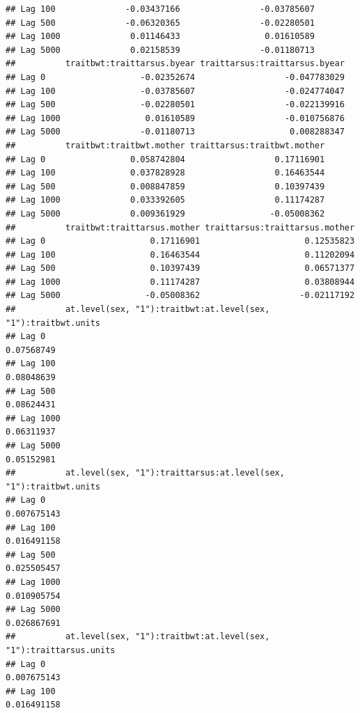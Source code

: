\documentclass[
  12pt,
]{book}
\begin{document}
\begin{verbatim}
## Lag 100              -0.03437166                -0.03785607
## Lag 500              -0.06320365                -0.02280501
## Lag 1000              0.01146433                 0.01610589
## Lag 5000              0.02158539                -0.01180713
##          traitbwt:traittarsus.byear traittarsus:traittarsus.byear
## Lag 0                   -0.02352674                  -0.047783029
## Lag 100                 -0.03785607                  -0.024774047
## Lag 500                 -0.02280501                  -0.022139916
## Lag 1000                 0.01610589                  -0.010756876
## Lag 5000                -0.01180713                   0.008288347
##          traitbwt:traitbwt.mother traittarsus:traitbwt.mother
## Lag 0                 0.058742804                  0.17116901
## Lag 100               0.037828928                  0.16463544
## Lag 500               0.008847859                  0.10397439
## Lag 1000              0.033392605                  0.11174287
## Lag 5000              0.009361929                 -0.05008362
##          traitbwt:traittarsus.mother traittarsus:traittarsus.mother
## Lag 0                     0.17116901                     0.12535823
## Lag 100                   0.16463544                     0.11202094
## Lag 500                   0.10397439                     0.06571377
## Lag 1000                  0.11174287                     0.03808944
## Lag 5000                 -0.05008362                    -0.02117192
##          at.level(sex, "1"):traitbwt:at.level(sex, "1"):traitbwt.units
## Lag 0                                                       0.07568749
## Lag 100                                                     0.08048639
## Lag 500                                                     0.08624431
## Lag 1000                                                    0.06311937
## Lag 5000                                                    0.05152981
##          at.level(sex, "1"):traittarsus:at.level(sex, "1"):traitbwt.units
## Lag 0                                                         0.007675143
## Lag 100                                                       0.016491158
## Lag 500                                                       0.025505457
## Lag 1000                                                      0.010905754
## Lag 5000                                                      0.026867691
##          at.level(sex, "1"):traitbwt:at.level(sex, "1"):traittarsus.units
## Lag 0                                                         0.007675143
## Lag 100                                                       0.016491158

\end{verbatim}
\end{document}
